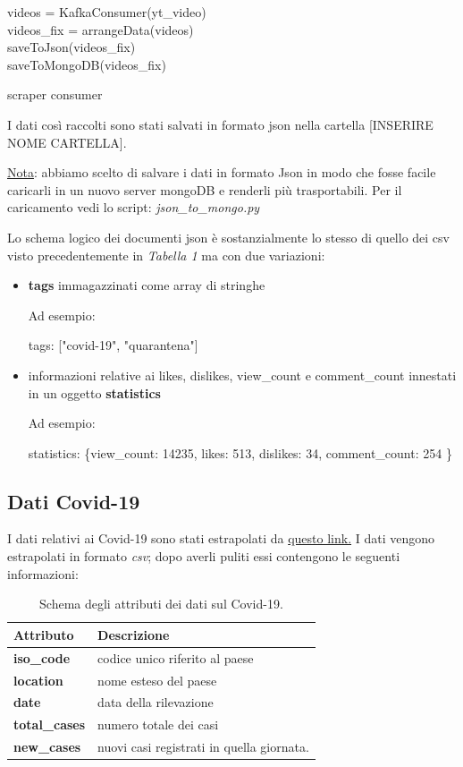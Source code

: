 \begin{algorithm}[H]
	\nl {} {
		\nl {}
		{
			\nl videos = KafkaConsumer(yt\_video)\\
			\nl videos\_fix = arrangeData(videos)\\ 
			\nl saveToJson(videos\_fix)\\
			\nl saveToMongoDB(videos\_fix)
		}
	}
	\caption{scraper consumer}
\end{algorithm}
I dati così raccolti sono stati salvati in formato json nella cartella [INSERIRE NOME CARTELLA].

\underline{Nota}: abbiamo scelto di salvare i dati in formato Json in modo che fosse facile caricarli in un nuovo server mongoDB e renderli più trasportabili. Per il caricamento vedi lo script: \textit{json\_to\_mongo.py}

Lo schema logico dei documenti json è sostanzialmente lo stesso di quello dei csv visto precedentemente in \textit{Tabella 1} ma con due variazioni:
\begin{itemize}
	\item \textbf{tags} immagazzinati come array di stringhe
	
	Ad esempio:
	
	tags: ["covid-19", "quarantena"]
	\item informazioni relative ai likes, dislikes, view\_count e comment\_count innestati in un oggetto \textbf{statistics}
	
	Ad esempio:
	
	statistics: \{view\_count: 14235,
				likes: 513,
				dislikes: 34,
				comment\_count: 254
				\}
\end{itemize}
\subsection*{Dati Covid-19}

I dati relativi ai Covid-19 sono stati estrapolati da  \href{https://ourworldindata.org/coronavirus-testing}{questo link.} I dati vengono estrapolati in formato \textit{csv}; dopo averli puliti essi contengono le seguenti informazioni:
\begin{table}[H]
	\centering
	\begin{tabular}{l|l}
		\textbf{Attributo} & \textbf{Descrizione} \\
		\hline
		\textbf{iso\_code} & codice unico riferito al paese \\\hline
		\textbf{location} & nome esteso del paese\\\hline
		\textbf{date} & data della rilevazione\\\hline
		\textbf{total\_cases} & numero totale dei casi\\\hline
		\textbf{new\_cases} & nuovi casi registrati in quella giornata.\\\hline

	\end{tabular}
	\caption{Schema degli attributi dei dati sul Covid-19.}
\end{table}

